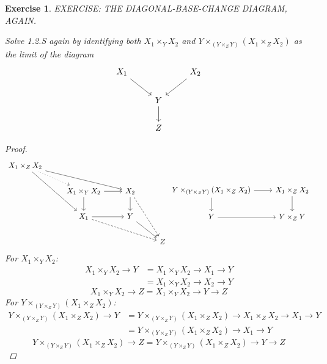 \documentclass{article}
\theoremstyle{breakstyle}
\newtheorem{exercise}{Exercise}[section]
\begin{document}
\begin{exercise}
EXERCISE: THE DIAGONAL-BASE-CHANGE DIAGRAM, AGAIN.

Solve 1.2.S again by identifying both $X_{1} \times_{Y} X_{2}$ and
$Y \times_{(Y \times_{Z} Y)} (X_{1} \times_{Z} X_{2})$ as the limit of the
diagram
$$
\begin{tikzcd}
    X_1 \arrow[rd] & & X_2 \arrow[ld] \\
    & Y \arrow[d] & \\
    & Z &
\end{tikzcd}
$$

\begin{proof}
	$$
	\begin{tikzcd}
        X_1\times_ZX_2 \arrow[rd, dotted] \arrow[rdd] \arrow[rrd] &                                    &                                   &   \\
                                                                  & X_1\times_YX_2 \arrow[r] \arrow[d] & X_2 \arrow[d] \arrow[rdd, dashed] &   \\
                                                                  & X_1 \arrow[r] \arrow[rrd, dashed]  & Y \arrow[rd]                      &   \\
                                                                  &                                    &                                   & Z
	\end{tikzcd}
	\begin{tikzcd}
        Y\times_{(Y\times_ZY)}(X_1\times_ZX_2) \arrow[d] \arrow[r] & X_1\times_ZX_2 \arrow[d] \\
        Y \arrow[r]                                                 & Y\times_ZY              
	\end{tikzcd}
	$$ 
	For $X_1\times _{Y}X_2$:
	\begin{align*}
		X_1\times _{Y}X_2\rightarrow Y
        &=X_1\times _{Y}X_2\rightarrow X_1\rightarrow Y\\
		&=X_1\times _{Y}X_2\rightarrow X_2\rightarrow Y
	\end{align*}
	$$
	X_1\times _{Y}X_2\rightarrow Z=X_1\times _{Y}X_2\rightarrow Y\rightarrow Z
	$$ 
	For $Y\times_{(Y\times _{Z}Y)}(X_1\times _{Z}X_2)$:
	\begin{align*}
		Y\times_{(Y\times _{Z}Y)}(X_1\times _{Z}X_2)\rightarrow Y
		&=Y\times_{(Y\times _{Z}Y)}(X_1\times _{Z}X_2)\rightarrow X_1\times _{Z}X_2\rightarrow X_1\rightarrow Y\\
		&=Y\times_{(Y\times _{Z}Y)}(X_1\times _{Z}X_2)\rightarrow X_1\rightarrow Y
	\end{align*}
	$$
	Y\times _{(Y\times _{Z}Y)}(X_1\times _{Z}X_2)\rightarrow Z=
	Y\times _{(Y\times _{Z}Y)}(X_1\times _{Z}X_2)\rightarrow Y\rightarrow Z
	$$ 
\end{proof}

\end{exercise}
\end{document}
